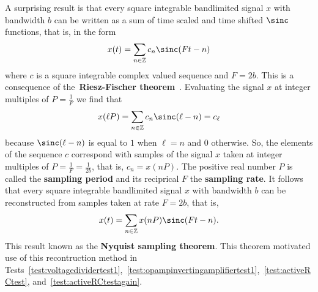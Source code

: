\documentclass[11pt,a4paper]{book}
\theoremstyle{plain}
\numberwithin{equation}{section}
\newcommand{\ints}{{\mathbb Z}}
\newcommand{\complex}{{\mathbb C}}
\newcommand{\term}{\textbf}
\newcommand{\abs}[1]{\left\vert #1 \right\vert}
\newcounter{test}
\begin{document}


A surprising result is that every square integrable bandlimited signal $x$ with bandwidth $b$ can be written as a sum of time scaled and time shifted $\sinc$ functions, that is, in the form
\begin{equation}\label{eq:sincinterformula}
x(t) = \sum_{n \in \ints} c_n \sinc(F t - n)
\end{equation}
where $c$ is a square integrable complex valued sequence and $F = 2b$.  This is a consequence of the~\term{Riesz-Fischer theorem}~\cite[page~91]{Rudin_real_and_complex_analysis}.  Evaluating the signal $x$ at integer multiples of $P = \tfrac{1}{F}$ we find that
\[
x(\ell P) = \sum_{n \in \ints} c_n \sinc( \ell - n ) = c_\ell
\]
because $\sinc( \ell - n)$ is equal to $1$ when $\ell = n$ and $0$ otherwise.  So, the elements of the sequence $c$ correspond with samples of the signal $x$ taken at integer multiples of $P = \tfrac{1}{F} = \tfrac{1}{2b}$, that is, $c_n = x(nP)$.  The positive real number $P$ is called the \term{sampling period} and its reciprical $F$ the \term{sampling rate}.  It follows that every square integrable bandlimited signal $x$ with bandwidth $b$ can be reconstructed from samples taken at rate $F = 2b$, that is,
\[
x(t) = \sum_{n \in \ints} x( n P ) \sinc(F t - n).
\]
This result known as the \term{Nyquist sampling theorem}.  %
This theorem motivated use of this recontruction method in Tests~\ref{test:voltagedividertest1},~\ref{test:opampinvertingamplifiertest1},~\ref{test:activeRCtest}, and~\ref{test:activeRCtestagain}.
\end{document}
